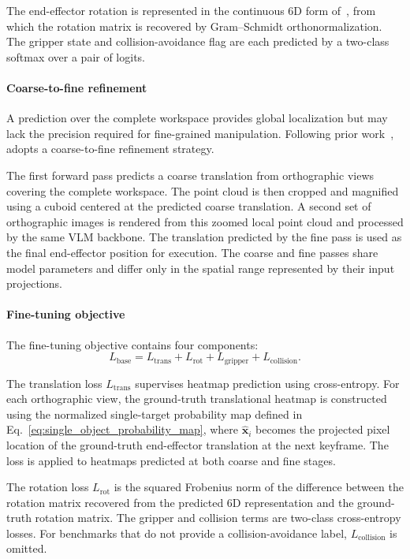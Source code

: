 The end-effector rotation is represented in the continuous 6D form
of~\cite{zhou2019continuity}, from which the rotation matrix is recovered by
Gram--Schmidt orthonormalization.
The gripper state and collision-avoidance flag are each predicted by a
two-class softmax over a pair of logits.

\paragraph{Coarse-to-fine refinement}
A prediction over the complete workspace provides global localization but
may lack the precision required for fine-grained manipulation.
Following prior work~\cite{james2022coarse,goyal2024rvt}, \method adopts a
coarse-to-fine refinement strategy.

The first forward pass predicts a coarse translation from orthographic views
covering the complete workspace.
The point cloud is then cropped and magnified using a cuboid centered at the
predicted coarse translation.
A second set of orthographic images is rendered from this zoomed local point
cloud and processed by the same VLM backbone.
The translation predicted by the fine pass is used as the final
end-effector position for execution.
The coarse and fine passes share model parameters and differ only in the
spatial range represented by their input projections.

\paragraph{Fine-tuning objective}
The fine-tuning objective contains four components:
\begin{equation}
L_{\mathrm{base}}
=
L_{\mathrm{trans}}
+
L_{\mathrm{rot}}
+
L_{\mathrm{gripper}}
+
L_{\mathrm{collision}}.
\label{eq:base_loss}
\end{equation}

The translation loss $L_{\mathrm{trans}}$ supervises heatmap prediction
using cross-entropy.
For each orthographic view, the ground-truth translational heatmap is
constructed using the normalized single-target probability map defined in
Eq.~\eqref{eq:single_object_probability_map}, where
$\widehat{\mathbf{x}}_i$ becomes the projected pixel location of the
ground-truth end-effector translation at the next keyframe.
The loss is applied to heatmaps predicted at both coarse and fine
stages.

The rotation loss $L_{\mathrm{rot}}$ is the squared Frobenius norm of the
difference between the rotation matrix recovered from the predicted 6D
representation and the ground-truth rotation matrix.
The gripper and collision terms are two-class cross-entropy losses.
For benchmarks that do not provide a collision-avoidance label,
$L_{\mathrm{collision}}$ is omitted.

